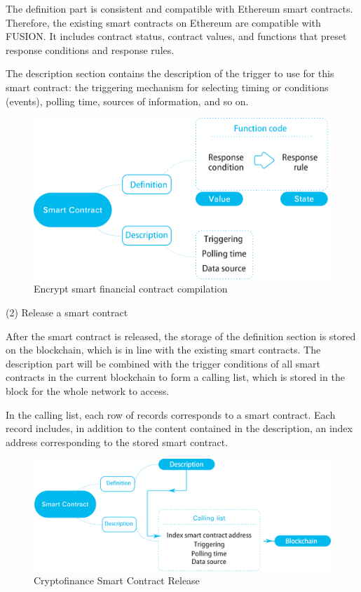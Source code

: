 \documentclass[a4paper,12pt]{article}
\begin{document}
The definition part is consistent and compatible with Ethereum smart contracts. Therefore, the existing smart contracts on Ethereum are compatible with FUSION. It includes contract status, contract values, and functions that preset response conditions and response rules. 

The description section contains the description of the trigger to use for this smart contract: the triggering mechanism for selecting timing or conditions (events), polling time, sources of information, and so on.

\begin{figure} [htbp]
\centering \includegraphics [width = 5in]{pic/CFSC.png}
\caption{Encrypt smart financial contract compilation} \label{fig: 1}
\end{figure}

(2) Release a smart contract

After the smart contract is released, the storage of the definition section is stored on the blockchain, which is in line with the existing smart contracts. The description part will be combined with the trigger conditions of all smart contracts in the current blockchain to form a calling list, which is stored in the block for the whole network to access.

In the calling list, each row of records corresponds to a smart contract. Each record includes, in addition to the content contained in the description, an index address corresponding to the stored smart contract.


\begin{figure} [htbp]
\centering \includegraphics [width = 5in]{pic/CFSCre.png}
\caption{Cryptofinance Smart Contract Release} \label{fig: 1}
\end{figure}
\end{document}
